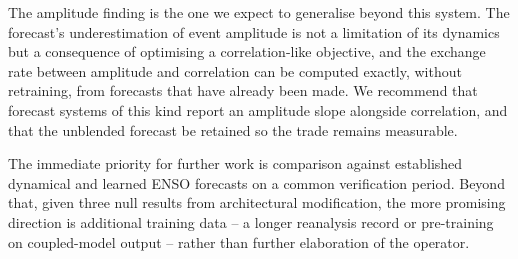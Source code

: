 The amplitude finding is the one we expect to generalise beyond this system. The forecast's
underestimation of event amplitude is not a limitation of its dynamics but a consequence of
optimising a correlation-like objective, and the exchange rate between amplitude and
correlation can be computed exactly, without retraining, from forecasts that have already been
made. We recommend that forecast systems of this kind report an amplitude slope alongside
correlation, and that the unblended forecast be retained so the trade remains measurable.

The immediate priority for further work is comparison against established dynamical and learned
ENSO forecasts on a common verification period. Beyond that, given three null results from
architectural modification, the more promising direction is additional training data --
a longer reanalysis record or pre-training on coupled-model output -- rather than further
elaboration of the operator.
